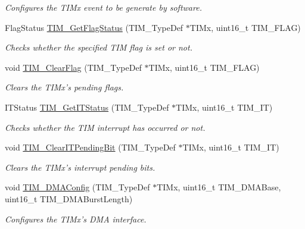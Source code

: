 \begin{DoxyCompactItemize}
\begin{DoxyCompactList}\small\item\em Configures the T\-I\-Mx event to be generate by software. \end{DoxyCompactList}\item 
Flag\-Status \hyperlink{group___t_i_m_ga0adcbbd5e838ec8642e7a9b80075f41f}{T\-I\-M\-\_\-\-Get\-Flag\-Status} (T\-I\-M\-\_\-\-Type\-Def $\ast$T\-I\-Mx, uint16\-\_\-t T\-I\-M\-\_\-\-F\-L\-A\-G)
\begin{DoxyCompactList}\small\item\em Checks whether the specified T\-I\-M flag is set or not. \end{DoxyCompactList}\item 
void \hyperlink{group___t_i_m_ga46568c7b254941dc53e785342d60baf3}{T\-I\-M\-\_\-\-Clear\-Flag} (T\-I\-M\-\_\-\-Type\-Def $\ast$T\-I\-Mx, uint16\-\_\-t T\-I\-M\-\_\-\-F\-L\-A\-G)
\begin{DoxyCompactList}\small\item\em Clears the T\-I\-Mx's pending flags. \end{DoxyCompactList}\item 
I\-T\-Status \hyperlink{group___t_i_m_ga0827a0b411707304f76d33050727c24d}{T\-I\-M\-\_\-\-Get\-I\-T\-Status} (T\-I\-M\-\_\-\-Type\-Def $\ast$T\-I\-Mx, uint16\-\_\-t T\-I\-M\-\_\-\-I\-T)
\begin{DoxyCompactList}\small\item\em Checks whether the T\-I\-M interrupt has occurred or not. \end{DoxyCompactList}\item 
void \hyperlink{group___t_i_m_ga9eb1e95af71ed380f51a2c6d585cc5d6}{T\-I\-M\-\_\-\-Clear\-I\-T\-Pending\-Bit} (T\-I\-M\-\_\-\-Type\-Def $\ast$T\-I\-Mx, uint16\-\_\-t T\-I\-M\-\_\-\-I\-T)
\begin{DoxyCompactList}\small\item\em Clears the T\-I\-Mx's interrupt pending bits. \end{DoxyCompactList}\item 
void \hyperlink{group___t_i_m_gad7156f84c436c8ac92cd789611826d09}{T\-I\-M\-\_\-\-D\-M\-A\-Config} (T\-I\-M\-\_\-\-Type\-Def $\ast$T\-I\-Mx, uint16\-\_\-t T\-I\-M\-\_\-\-D\-M\-A\-Base, uint16\-\_\-t T\-I\-M\-\_\-\-D\-M\-A\-Burst\-Length)
\begin{DoxyCompactList}\small\item\em Configures the T\-I\-Mx's D\-M\-A interface. \end{DoxyCompactList}\item 

\end{DoxyCompactItemize}
